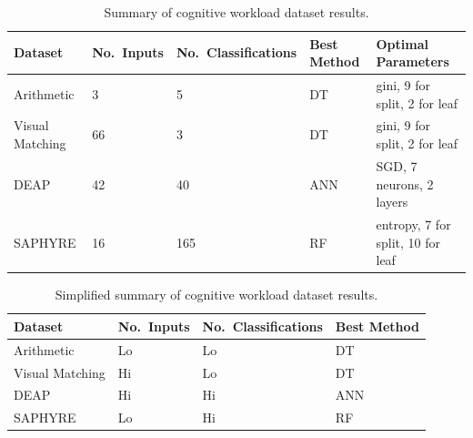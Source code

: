 \documentclass[12pt]{uthesis-v12}  %
\begin{document}
\begin{table}[!t]
\caption{Summary of cognitive workload dataset results.}
\renewcommand{\arraystretch}{1.3}
\centering
\resizebox{\textwidth}{!}
{\begin{tabular}{*{5}{l}}
\toprule
Dataset & No.~Inputs & No.~Classifications & Best Method & Optimal Parameters \\ \midrule
Arithmetic & 3 & 5 & DT & gini, 9 for split, 2 for leaf\\
Visual Matching & 66 & 3 & DT & gini, 9 for split, 2 for leaf \\
DEAP & 42 & 40 & ANN & SGD, 7 neurons, 2 layers \\
SAPHYRE & 16 & 165 & RF & entropy, 7 for split, 10 for leaf \\ \bottomrule
\end{tabular}}

\label{ch3-results1}
\end{table}

\begin{table}[!t]
\caption{Simplified summary of cognitive workload dataset results.}
\renewcommand{\arraystretch}{1.3}
\centering
{\begin{tabular}{*{4}{l}}
\toprule
Dataset & No.~Inputs & No.~Classifications & Best Method \\ \midrule
Arithmetic & Lo & Lo & DT \\
Visual Matching & Hi & Lo & DT \\
DEAP & Hi & Hi & ANN \\
SAPHYRE & Lo & Hi & RF \\ \bottomrule
\end{tabular}}

\label{ch3-results2}
\end{table}
\end{document}
